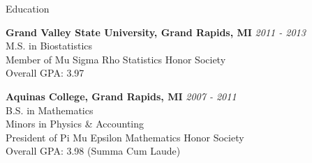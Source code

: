 \documentclass{resume} %
\begin{document}

\begin{rSection}{Education}

{\bf Grand Valley State University, Grand Rapids, MI} \hfill {\em 2011 - 2013} \\ 
M.S. in Biostatistics \smallskip\\
Member of Mu Sigma Rho Statistics Honor Society\\
Overall GPA: 3.97

{\bf Aquinas College, Grand Rapids, MI} \hfill {\em 2007 - 2011} \\ 
B.S. in Mathematics \\
Minors in Physics \& Accounting
\smallskip \\
President of Pi Mu Epsilon Mathematics Honor Society\\
Overall GPA: 3.98 (Summa Cum Laude)


\end{rSection}

\end{document}
